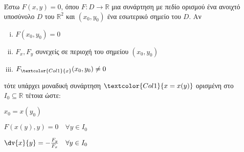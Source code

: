     Έστω $ F(x,y) = 0 $, όπου $ F\colon D \to \mathbb{R} $ μια συνάρτηση με πεδίο
    ορισμού ένα ανοιχτό υποσύνολο $D$ του $\mathbb{R}^{2}$ και $ (x_0,y_0) $ ένα 
    εσωτερικό σημείο του $D$.  Αν 
    \begin{enumerate}[(i)]
      \item $F(x_0,y_0) = 0$ 
      \item $ F_x, F_y$ συνεχείς σε περιοχή του σημείου $ (x_0,y_0) $ 
      \item $ F_{\textcolor{Col1}{x}}(x_0,y_0) \neq 0 $
    \end{enumerate}
    τότε υπάρχει μοναδική συνάρτηση $ \textcolor{Col1}{x=x(y)} $ ορισμένη στο $ I_0 \subseteq \mathbb{R} $ 
    τέτοια ώστε:
    \begin{myitemize}
      \item $x_0 = x(y_0)$
      \item $F(x(y),y) = 0 \quad \forall y \in I_0$
      \item $ \dv{x}{y} = - \frac{F_y}{F_x} \quad \forall y \in I_0  $
    \end{myitemize}

